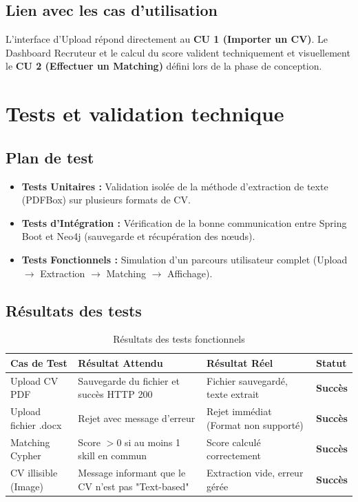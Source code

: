 \documentclass[12pt,a4paper]{report}
\begin{document}
\begin{itemize}
\subsection{Lien avec les cas d'utilisation}
L'interface d'Upload répond directement au \textbf{CU 1 (Importer un CV)}. Le Dashboard Recruteur et le calcul du score valident techniquement et visuellement le \textbf{CU 2 (Effectuer un Matching)} défini lors de la phase de conception.

\section{Tests et validation technique}

\subsection{Plan de test}
\begin{itemize}
    \item \textbf{Tests Unitaires :} Validation isolée de la méthode d'extraction de texte (PDFBox) sur plusieurs formats de CV.
    \item \textbf{Tests d'Intégration :} Vérification de la bonne communication entre Spring Boot et Neo4j (sauvegarde et récupération des nœuds).
    \item \textbf{Tests Fonctionnels :} Simulation d'un parcours utilisateur complet (Upload $\rightarrow$ Extraction $\rightarrow$ Matching $\rightarrow$ Affichage).
\end{itemize}

\subsection{Résultats des tests}
\begin{table}[h]
\centering
\begin{tabular}{|p{3cm}|p{4cm}|p{4cm}|p{2cm}|}
\hline
\textbf{Cas de Test} & \textbf{Résultat Attendu} & \textbf{Résultat Réel} & \textbf{Statut} \\
\hline
Upload CV PDF & Sauvegarde du fichier et succès HTTP 200 & Fichier sauvegardé, texte extrait & \textbf{Succès} \\
\hline
Upload fichier .docx & Rejet avec message d'erreur & Rejet immédiat (Format non supporté) & \textbf{Succès} \\
\hline
Matching Cypher & Score $> 0$ si au moins 1 skill en commun & Score calculé correctement & \textbf{Succès} \\
\hline
CV illisible (Image) & Message informant que le CV n'est pas "Text-based" & Extraction vide, erreur gérée & \textbf{Succès} \\
\hline
\end{tabular}
\caption{Résultats des tests fonctionnels}
\end{table}


\end{itemize}
\end{document}
